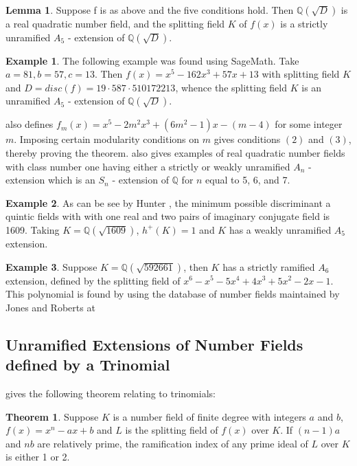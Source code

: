 \documentclass[12pt]{extarticle}
\newcommand{\Q}{\mathbb{Q}}
\newcommand{\<}{\langle}
\renewcommand{\>}{\rangle}
\theoremstyle{definition}
\newtheorem{theorem}{Theorem}
\newtheorem*{example}{Example}
\newtheorem{lemma}{Lemma}
\begin{document}
\begin{lemma}
Suppose f is as above and the five conditions hold. Then $\Q(\sqrt{D})$ is a real quadratic number field, and the splitting field $K$ of $f(x) $ is a strictly unramified $A_5$ - extension of $\Q(\sqrt{D})$. 
\end{lemma}
\begin{example}
    The following example was found using SageMath. Take $a=81,b=57,c=13$. Then $f(x) = x^5-162x^3+57x+13$ with splitting field $K$ and $D= disc(f) = 19 \cdot 587 \cdot 510172213$, whence the splitting field $K$ is an unramified $A_5$ - extension of $\Q(\sqrt{D})$. 
\end{example}
\cite{yamamura1986} also defines $f_m(x)= x^5-2m^2x^3+(6m^2-1)x-(m-4)$ for some integer $m$. Imposing certain modularity conditions on $m$ gives conditions $(2)$ and $(3)$, thereby proving the theorem. 
\cite{yamamura1986} also gives examples of real quadratic number fields with class number one having either a strictly or weakly unramified $A_n$ - extension which is an $S_n$ - extension of $\Q$ for $n$ equal to 5, 6, and 7. 
\begin{example}
As can be see by Hunter \cite{HUNTER}, the minimum possible discriminant a quintic fields with with one real and two pairs of imaginary conjugate field is 1609. 
Taking $K=\Q(\sqrt{1609})$, $h^{+}(K)=1$ and $K$ has a weakly unramified $A_5$ extension.
\end{example}
\begin{example}
Suppose $K=\Q(\sqrt{592661})$, then $K$ has a strictly ramified $A_6$ extension, defined by the splitting field of  $x^6 - x^5 - 5x^4 + 4x^3 + 5x^2 - 2x - 1$. This polynomial is found by using the database of number fields maintained by Jones and Roberts at \cite{JONE2}
\end{example}
\subsection{Unramified Extensions of Number Fields defined by a Trinomial}
\cite{uchida1970} gives the following theorem relating to trinomials:
\begin{theorem}
Suppose $K$ is a number field of finite degree with integers $a$ and $b$, $f(x) = x^n-ax+b$ and $L$ is the splitting field of $f(x)$ over $K$. If $(n-1)a$ and $nb$ are relatively prime, the ramification index of any prime ideal of $L$ over $K$ is either 1 or 2. 
\end{theorem}
\end{document}
